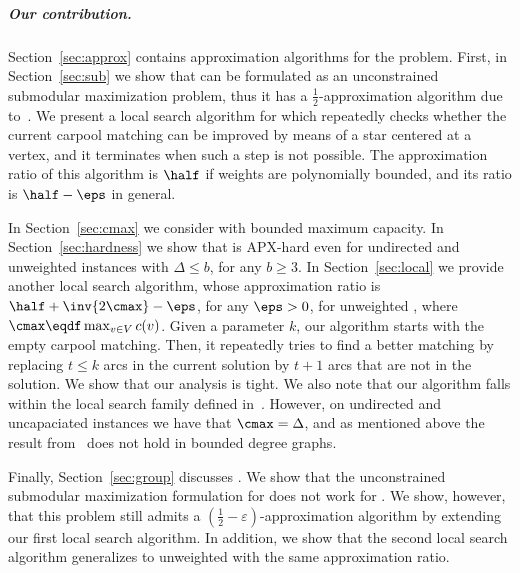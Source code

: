 
\subparagraph{Our contribution.}
%
Section~\ref{sec:approx} contains approximation algorithms
for the \carpool problem.  
First, in Section~\ref{sec:sub} we show that \carpool
can be formulated as an unconstrained submodular maximization problem,
thus it has a $\frac{1}{2}$-approximation algorithm due
to~\cite{BFNS15,buchbinder2016deterministic}.
%
We present a local search algorithm for \carpool which repeatedly
checks whether the current carpool matching can be improved by means
of a star centered at a vertex, and it terminates when such a step is
not possible.
%
The approximation ratio of this algorithm is $\half$ if weights are
polynomially bounded, and its ratio is $\half-\eps$ in general.

In Section~\ref{sec:cmax} we consider \carpool with boun\-ded maximum
capacity.   
%
In Section~\ref{sec:hardness} we show that \carpool is APX-hard even
for undirected and unweighted instances with $\Delta \leq b$, for any
$b \geq 3$.
%
In Section~\ref{sec:local} we provide another local search algorithm,
whose approximation ratio is $\half + \inv{2\cmax} - \eps$, for any
$\eps>0$, for unweighted \carpool, where $\cmax \eqdf \max_{v \in V}
c(v)$.  Given a parameter $k$, our algorithm starts with the empty
carpool matching.  Then, it repeatedly tries to find a better matching
by replacing $t \leq k$ arcs in the current solution by $t+1$ arcs
that are not in the solution.
%
We show that our analysis is tight.
%
We also note that our algorithm falls within the local search family
defined in~\cite{ACKK09}.  However, on undirected and uncapaciated
instances we have that $\cmax = \Delta$, and as mentioned above the
result from~\cite{ACKK09} does not hold in bounded degree graphs.

Finally, Section~\ref{sec:group} discusses \gcp.  We show that the
unconstrained submodular maximization formulation for \carpool does
not work for \gcp.  We show, however, that this problem still admits a
$(\frac{1}{2} -\varepsilon)$-approximation algorithm by extending our
first local search algorithm.  In addition, we show that the second
local search algorithm generalizes to unweighted \gcp with the same
approximation ratio.
